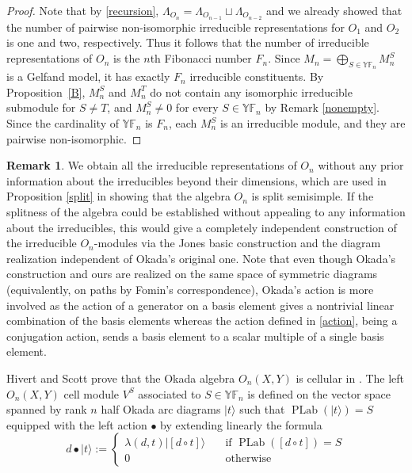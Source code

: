 \documentclass[12pt,reqno]{amsart}
\numberwithin{equation}{section}
\theoremstyle{definition}
\theoremstyle{definition}
\newtheorem{remark}[theorem]{Remark}
\newcommand{\YF}{\mathbb{YF}}
\newcommand{\PLab}{\operatorname{PLab}}
\begin{document}
\begin{proof}
Note that by \eqref{recursion}, $\Lambda_{O_n} = \Lambda_{O_{n-1}} \sqcup \Lambda_{O_{n-2}} $ and we already showed that the number of pairwise non-isomorphic irreducible representations for $O_1$ and $O_2$ is one and two, respectively. Thus it follows that the number of irreducible representations of $O_n$ is the $n$th Fibonacci number $F_n$. Since $M_n= \bigoplus_{S \in \YF_n}M_n^S$ is a Gelfand model, it has exactly $F_n$ irreducible constituents. By Proposition~\ref{B}, $M_n^S$ and $M_n^T$ do not contain any isomorphic irreducible submodule for $S\neq T$, and $M_n^S \neq 0$ for every  $S \in \YF_n $ by Remark \ref{nonempty}. Since the cardinality of $\YF_n$ is $F_n$, each $M_n^S$ is an irreducible module, and they are pairwise non-isomorphic. 
\end{proof}
\begin{remark}
    We obtain all the irreducible representations of $O_n$ without any prior information about the irreducibles beyond their dimensions, which are used in Proposition \ref{split} in showing that the algebra $O_n$ is split semisimple. If the splitness of the algebra could be established without appealing to any information about the irreducibles, this would give a completely independent construction of the irreducible $O_n$-modules via the Jones basic construction and the diagram realization independent of Okada's original one. Note that even though Okada's construction and ours are realized on the same space of symmetric diagrams (equivalently, on paths by Fomin's correspondence), Okada's action is more involved as the action of a generator on a basis element gives a nontrivial linear combination of the basis elements whereas the action defined in \eqref{action}, being a conjugation action, sends a basis element to a scalar multiple of a single basis element. 
\end{remark}
Hivert and Scott prove that the Okada algebra $O_n(X,Y)$ is cellular in \cite[Theorem 6.3]{HivertScott}.
The left $O_n(X,Y)$ cell module $V^S$ associated to $S \in \YF_n$ is defined on the vector space spanned by rank $n$ half Okada arc diagrams $|t \rangle$ such that $\PLab(|t \rangle)=S$ equipped with the left action $\bullet$ by extending linearly the formula
\begin{equation}\label{Scottmodules}
    d \bullet |t \rangle := \begin{cases}
    \lambda(d,t)| [d \circ t] \rangle \quad &\text{if $\PLab([d \circ t])=S$}\\
    0 \quad & \text{otherwise}
    \end{cases}
\end{equation}
\end{document}
